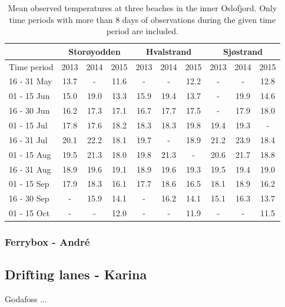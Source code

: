 \documentclass[12pt,a4paper,english]{article}
\begin{document}
\begin{table}[ht]
\caption{Mean observed temperatures at three beaches in the inner Oslofjord. Only time periods with more than 8 days of observations during the given time period are included.}
\label{tab:temp_strand}
\begin{center}
\begin{tabular}{|l|ccc|ccc|ccc|} \hline
     & \multicolumn{3}{c|}{Stor\o yodden} & \multicolumn{3}{c|}{Hvalstrand} & \multicolumn{3}{c|}{Sj\o strand} \\ \hline
Time period & 2013 & 2014 & 2015 & 2013 & 2014 & 2015 & 2013 & 2014 & 2015 \\ \hline
16 - 31 May & 13.7 &  -   & 11.6 &  -   &  -   & 12.2 &  -   &  -   & 12.8 \\ 
01 - 15 Jun & 15.0 & 19.0 & 13.3 & 15.9 & 19.4 & 13.7 &  -   & 19.9 & 14.6 \\ 
16 - 30 Jun & 16.2 & 17.3 & 17.1 & 16.7 & 17.7 & 17.5 &  -   & 17.9 & 18.0 \\ 
01 - 15 Jul & 17.8 & 17.6 & 18.2 & 18.3 & 18.3 & 19.8 & 19.4 & 19.3 &  -   \\ 
16 - 31 Jul & 20.1 & 22.2 & 18.1 & 19.7 &  -   & 18.9 & 21.2 & 23.9 & 18.4 \\ 
01 - 15 Aug & 19.5 & 21.3 & 18.0 & 19.8 & 21.3 &  -   & 20.6 & 21.7 & 18.8 \\ 
16 - 31 Aug & 18.9 & 19.6 & 19.1 & 18.9 & 19.6 & 19.3 & 19.5 & 19.4 & 19.0 \\ 
01 - 15 Sep & 17.9 & 18.3 & 16.1 & 17.7 & 18.6 & 16.5 & 18.1 & 18.9 & 16.2 \\ 
16 - 30 Sep &  -   & 15.9 & 14.1 &  -   & 16.2 & 14.1 & 15.1 & 16.3 & 13.7 \\ 
01 - 15 Oct &  -   &  -   & 12.0 &  -   &  -   & 11.9 &  -   &  -   & 11.5 \\ 
\hline
\end{tabular}
\end{center}
\end{table}

\subsubsection{Ferrybox - Andr\'{e}}

\subsection{Drifting lanes - Karina}
Godafoss ...
\end{document}
